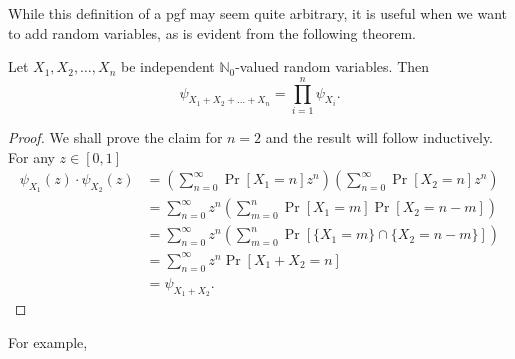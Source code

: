 While this definition of a pgf may seem quite arbitrary, it is useful when we want to add random variables, as is evident from the following theorem.

\begin{theorem}
\label{sum of randvars is prod of pgfs}
    Let $X_1,X_2,\ldots,X_n$ be independent $\mathbb{N}_0$-valued random variables. Then
    $$\psi_{X_1+X_2+\ldots+X_n}=\prod_{i=1}^n \psi_{X_i}.$$
\end{theorem}
\begin{proof}
    We shall prove the claim for $n=2$ and the result will follow inductively. For any $z\in[0,1]$
    \begin{align*}
        \psi_{X_1}(z)\cdot\psi_{X_2}(z) &= \left(\sum_{n=0}^\infty \Pr[X_1=n]z^n\right)\left(\sum_{n=0}^\infty \Pr[X_2=n]z^n\right) \\
        &= \sum_{n=0}^\infty z^n\left(\sum_{m=0}^n\Pr[X_1=m]\Pr[X_2=n-m]\right) \\
        &= \sum_{n=0}^\infty z^n\left(\sum_{m=0}^n\Pr\left[\{X_1=m\}\cap \{X_2=n-m\}\right]\right) \\
        &= \sum_{n=0}^\infty z^n\Pr[X_1+X_2=n] \\
        &= \psi_{X_1+X_2}.
    \end{align*}
\end{proof}

For example,

